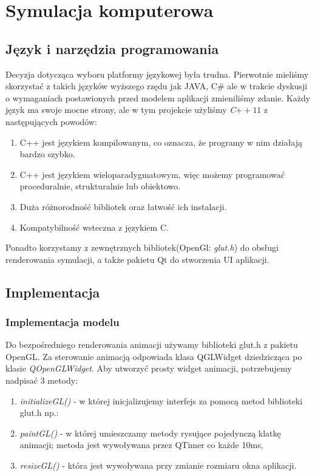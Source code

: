 \chapter{Symulacja komputerowa}
\section{Język i narzędzia programowania}
\hspace{4ex}Decyzja dotycząca wyboru platformy językowej była trudna. Pierwotnie mieliśmy skorzystać z takich języków wyższego rzędu jak JAVA, C\# ale w trakcie dyskusji o wymaganiach postawionych przed modelem aplikacji zmieniliśmy zdanie. Każdy język ma swoje mocne strony, ale w tym projekcie użyliśmy \emph{C$++11$} z następujących powodów:
\begin{enumerate}
  \item C++ jest językiem kompilowanym, co oznacza, że programy w nim działają bardzo szybko.
  \item C++ jest językiem wieloparadygmatowym, więc możemy programować proceduralnie, strukturalnie lub obiektowo.
  \item Duża różnorodność bibliotek oraz łatwość ich instalacji.
  \item Kompatybilność wsteczna z językiem C.
\end{enumerate}
\hspace{4ex}Ponadto korzystamy z zewnętrznych bibliotek(OpenGl: \emph{glut.h}) do obsługi renderowania symulacji, a także pakietu Qt do stworzenia UI aplikacji.
\section{Implementacja}
\subsection{Implementacja modelu}
\hspace{4ex}Do bezpośredniego renderowania animacji używamy biblioteki glut.h z pakietu OpenGL. Za sterowanie animacją odpowiada klasa QGLWidget dziedzicząca po klasie \emph{QOpenGLWidget}. Aby utworzyć prosty widget animacji, potrzebujemy nadpisać 3 metody: 
\begin{enumerate}
\item \emph{initializeGL()} - w której inicjalizujemy interfejs za pomocą metod biblioteki glut.h np.:
\item \emph{paintGL()} - w której umieszczamy metody rysujące pojedynczą klatkę animacji; metoda jest wywoływana przez QTimer co każde 10ms, 
\item \emph{resizeGL()} - która jest wywoływana przy zmianie rozmiaru okna aplikacji.
\end{enumerate}

